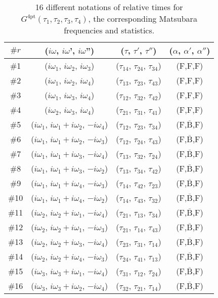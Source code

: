 \documentclass[prb,twocolumn,superscriptaddress]{revtex4-1}
\newcommand{\Gfour}{\ensuremath{G^\mathrm{4pt}}}
\begin{document}
\begin{table}
	\centering
	\begin{tabular}{c|c|c|c}
		\hline
		$\#r$ & ($i\omega$, $i\omega$', $i\omega$'') & ($\tau$, $\tau'$, $\tau''$) & ($\alpha$, $\alpha'$, $\alpha''$) \\
		\hline
		\hline
		\#1 & ($i\omega_1$, $i\omega_2$, $i\omega_3$) & ($\tau_{14}$, $\tau_{24}$, $\tau_{34}$) &  (F,F,F)  \\
		\#2 & ($i\omega_1$, $i\omega_2$, $i\omega_4$) & ($\tau_{13}$, $\tau_{23}$, $\tau_{43}$) &  (F,F,F)  \\
		\#3 & ($i\omega_1$, $i\omega_3$, $i\omega_4$) & ($\tau_{12}$, $\tau_{32}$, $\tau_{42}$) &  (F,F,F)  \\
		\#4 & ($i\omega_2$, $i\omega_3$, $i\omega_4$) & ($\tau_{21}$, $\tau_{31}$, $\tau_{41}$) &  (F,F,F)  \\ \hline
		\#5 & ($i\omega_1$, $i\omega_1 + i\omega_2$, $-i\omega_4$) & ($\tau_{12}$, $\tau_{23}$, $\tau_{34}$) &  (F,$\overline{\mathrm{B}}$,F)  \\
		\#6 & ($i\omega_1$, $i\omega_1 + i\omega_2$, $-i\omega_3$) & ($\tau_{12}$, $\tau_{24}$, $\tau_{43}$) &  (F,$\overline{\mathrm{B}}$,F)  \\
		\#7 & ($i\omega_1$, $i\omega_1 + i\omega_3$, $-i\omega_4$) & ($\tau_{13}$, $\tau_{32}$, $\tau_{24}$) &  (F,$\overline{\mathrm{B}}$,F)  \\
		\#8 & ($i\omega_1$, $i\omega_1 + i\omega_3$, $-i\omega_2$) & ($\tau_{13}$, $\tau_{34}$, $\tau_{42}$) &  (F,$\overline{\mathrm{B}}$,F)  \\
		\#9 & ($i\omega_1$, $i\omega_1 + i\omega_4$, $-i\omega_3$) & ($\tau_{14}$, $\tau_{42}$, $\tau_{23}$) &  (F,$\overline{\mathrm{B}}$,F)  \\
		\#10 & ($i\omega_1$, $i\omega_1 + i\omega_4$, $-i\omega_2$) & ($\tau_{14}$, $\tau_{43}$, $\tau_{32}$) &  (F,$\overline{\mathrm{B}}$,F)  \\
		\#11 & ($i\omega_2$, $i\omega_2 + i\omega_1$, $-i\omega_4$) & ($\tau_{21}$, $\tau_{13}$, $\tau_{34}$) &  (F,$\overline{\mathrm{B}}$,F)  \\
		\#12 & ($i\omega_2$, $i\omega_2 + i\omega_1$, $-i\omega_3$) & ($\tau_{21}$, $\tau_{14}$, $\tau_{43}$) &  (F,$\overline{\mathrm{B}}$,F)  \\
		\#13 & ($i\omega_2$, $i\omega_2 + i\omega_3$, $-i\omega_4$) & ($\tau_{23}$, $\tau_{31}$, $\tau_{14}$) &  (F,$\overline{\mathrm{B}}$,F)  \\
		\#14 & ($i\omega_2$, $i\omega_2 + i\omega_4$, $-i\omega_3$) & ($\tau_{24}$, $\tau_{41}$, $\tau_{13}$) &  (F,$\overline{\mathrm{B}}$,F)  \\
		\#15 & ($i\omega_3$, $i\omega_3 + i\omega_1$, $-i\omega_4$) & ($\tau_{31}$, $\tau_{12}$, $\tau_{24}$) &  (F,$\overline{\mathrm{B}}$,F)  \\
		\#16 & ($i\omega_3$, $i\omega_3 + i\omega_2$, $-i\omega_4$) & ($\tau_{32}$, $\tau_{21}$, $\tau_{14}$) &  (F,$\overline{\mathrm{B}}$,F)  \\
		\hline
	\end{tabular}
	\caption{16 different notations of relative times for $\Gfour(\tau_1,\tau_2,\tau_3,\tau_4)$, the corresponding Matsubara frequencies and statistics.}
	\label{table:summary}
\end{table}
\fi
\end{document}
